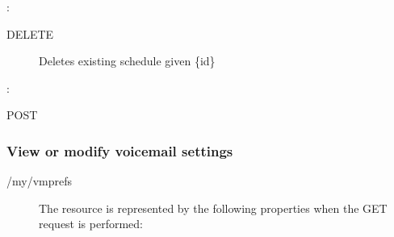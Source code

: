 \documentclass[letterpaper,10pt,english]{sphinxmanual}
\begin{document}
:

\begin{sphinxVerbatim}[commandchars=\\\{\}]
\end{sphinxVerbatim}
\begin{description}
\item[{ DELETE}] \leavevmode
Deletes existing schedule given \{id\}

\end{description}

:

\begin{sphinxVerbatim}[commandchars=\\\{\}]
\end{sphinxVerbatim}

 POST


\subsubsection{View or modify voicemail settings}
\label{\detokenize{restapi:view-or-modify-voicemail-settings}}
 /my/vmprefs
\begin{description}
\item[{}] \leavevmode
The resource is represented by the following properties when the GET request is performed:

\end{description}
\end{document}
